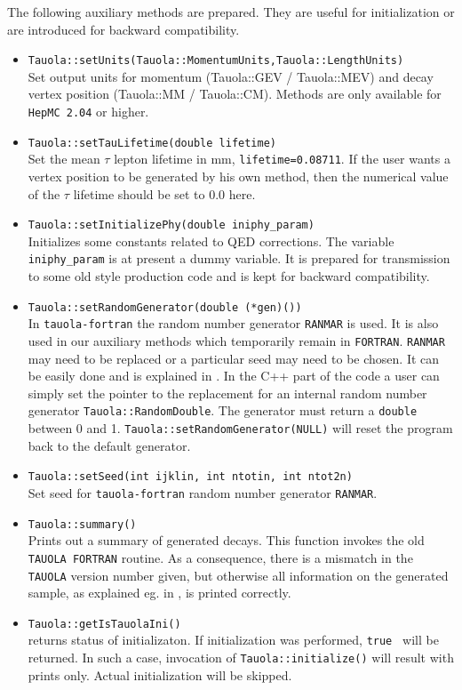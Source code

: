 \documentclass[]{Tauola_interface_design}
\begin{document}
The following auxiliary methods are prepared. They are useful for initialization 
or are introduced for backward compatibility.
\begin{itemize}
  \item {\tt Tauola::setUnits(Tauola::MomentumUnits,Tauola::LengthUnits)} \\
        Set output units for momentum (Tauola::GEV / Tauola::MEV)
        and decay vertex position (Tauola::MM / Tauola::CM). Methods are only available for {\tt HepMC 2.04} 
        or higher.
  \item {\tt Tauola::setTauLifetime(double lifetime)} \\
        Set the mean $\tau$ lepton lifetime in mm, {\tt lifetime=0.08711}. 
        If the user wants a vertex position
        to be generated by his own method, then the numerical value
        of the $\tau$ lifetime should be set to 0.0 here.
  \item {\tt Tauola::setInitializePhy(double iniphy\_param)} \\
        Initializes some constants related to QED corrections.
        The variable {\tt iniphy\_param} is at present a dummy variable. It is prepared for
        transmission to some
        old style production code and is kept for backward compatibility.
  \item {\tt Tauola::setRandomGenerator(double (*gen)())} \\
        In {\tt tauola-fortran} the random number generator {\tt RANMAR}
        is used. It is also used in our auxiliary methods which temporarily remain
        in {\tt FORTRAN}. {\tt RANMAR} may need to be replaced or a particular 
        seed may need to be chosen. It can be easily done and is explained in
        \cite{Golonka:2003xt}. In the C++ part of the code a user can simply 
        set the pointer to the replacement for an internal random number 
        generator {\tt Tauola::RandomDouble}.
        The generator must return  a {\tt double} between 0 and 1. 
        {\tt Tauola::setRandomGenerator(NULL)} will reset the program back to  
        the default  generator.
  \item {\tt Tauola::setSeed(int ijklin, int ntotin, int ntot2n)} \\
        Set seed for {\tt tauola-fortran} random number generator {\tt RANMAR}.
  \item {\tt Tauola::summary()} \\
        Prints out a summary of generated decays.
        This function invokes the old {\tt TAUOLA FORTRAN} routine. As a consequence,
        there is a mismatch in the {\tt TAUOLA} version number given,
        but otherwise all information on the generated sample, 
        as explained eg. in \cite{Jadach:1990mz,Jezabek:1991qp,Jadach:1993hs}, is printed correctly.
  \item {\tt Tauola::getIsTauolaIni()} \\ 
        returns status of initializaton. If initialization was 
        performed, {\tt true } will be returned. In such a case, 
        invocation of  {\tt Tauola::initialize()} will result with prints
        only. Actual initialization will be skipped.
\end{itemize}
\end{document}
